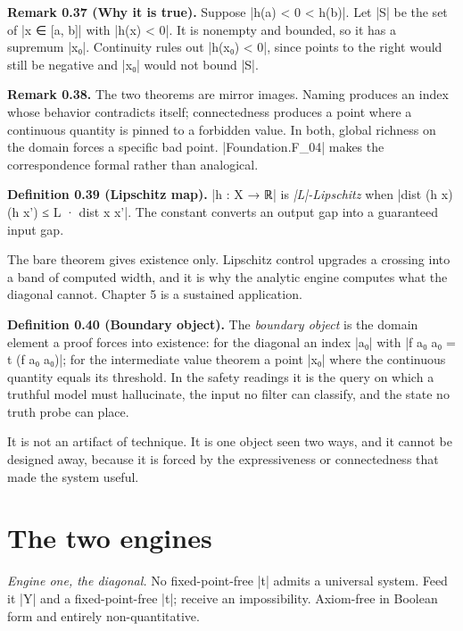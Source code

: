 \documentclass{memoir}
\begin{document}
\textbf{Remark 0.37 (Why it is true).} Suppose \LeanVerb|h(a) < 0 < h(b)|. Let \LeanVerb|S| be the set of
\LeanVerb|x ∈ [a, b]| with \LeanVerb|h(x) < 0|. It is nonempty and bounded, so it has a supremum
\LeanVerb|x₀|. Continuity rules out \LeanVerb|h(x₀) < 0|, since points to the right would still be
negative and \LeanVerb|x₀| would not bound \LeanVerb|S|.

\textbf{Remark 0.38.} The two theorems are mirror images. Naming produces an index whose
behavior contradicts itself; connectedness produces a point where a continuous
quantity is pinned to a forbidden value. In both, global richness on the domain
forces a specific bad point. \LeanVerb|Foundation.F_04| makes the correspondence formal
rather than analogical.

\textbf{Definition 0.39 (Lipschitz map).} \LeanVerb|h : X → ℝ| is \emph{\LeanVerb|L|-Lipschitz} when
\LeanVerb|dist (h x) (h x') ≤ L · dist x x'|. The constant converts an output gap into a
guaranteed input gap.

The bare theorem gives existence only. Lipschitz control upgrades a crossing
into a band of computed width, and it is why the analytic engine computes what
the diagonal cannot. Chapter 5 is a sustained application.

\textbf{Definition 0.40 (Boundary object).} The \emph{boundary object} is the domain element
a proof forces into existence: for the diagonal an index \LeanVerb|a₀| with \LeanVerb|f a₀ a₀ = t (f a₀ a₀)|;
for the intermediate value theorem a point \LeanVerb|x₀| where the continuous quantity
equals its threshold. In the safety readings it is the query on which a truthful
model must hallucinate, the input no filter can classify, and the state no truth
probe can place.

It is not an artifact of technique. It is one object seen two ways, and it
cannot be designed away, because it is forced by the expressiveness or
connectedness that made the system useful.



\section{The two engines}\label{Two--Schemas--of--Impossibility-005F-005F-005F--Machine--Checked--Limits--of--Trustworthy--Machine--Learning-005F-005F-005F--and--Why--They--Tighten--with--Capability----Preliminaries----The--two--engines}

\emph{Engine one, the diagonal.} No fixed-point-free \LeanVerb|t| admits a universal system.
Feed it \LeanVerb|Y| and a fixed-point-free \LeanVerb|t|; receive an impossibility. Axiom-free in
Boolean form and entirely non-quantitative.
\end{document}
